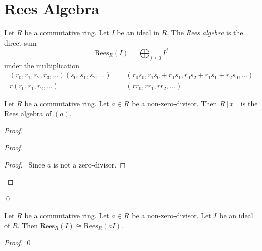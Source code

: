 \section{Rees Algebra}

\begin{df}
Let $R$ be a commutative ring. Let $I$ be an ideal in $R$. The \emph{Rees algebra} is the direct sum
\[ \mathrm{Rees}_R(I) = \bigoplus_{j \geq 0} I^j \]
under the multiplication 
\begin{align*}
(r_0, r_1, r_2, r_3, \ldots)(s_0, s_1, s_2, \ldots) & = (r_0s_0, r_1s_0 + r_0s_1, r_0s_2 + r_1s_1 + r_2s_0, \ldots) \\
r(r_0, r_1, r_2, \ldots) & = (rr_0, rr_1, rr_2, \ldots)
\end{align*}
\end{df}

\begin{prop}
Let $R$ be a commutative ring. Let $a \in R$ be a non-zero-divisor. Then $R[x]$ is the Rees algebra of $(a)$.
\end{prop}

\begin{proof}
\pf
{}
\begin{proof}
	\begin{proof}
		\pf\ Since $a$ is not a zero-divisor.
	\end{proof}
\end{proof}
\qed
\end{proof}

\begin{prop}
Let $R$ be a commutative ring. Let $a \in R$ be a non-zero-divisor. Let $I$ be an ideal of $R$. Then $\mathrm{Rees}_R(I) \cong \mathrm{Rees}_R(aI)$.
\end{prop}

\begin{proof}
\pf
{}
\qed
\end{proof}

